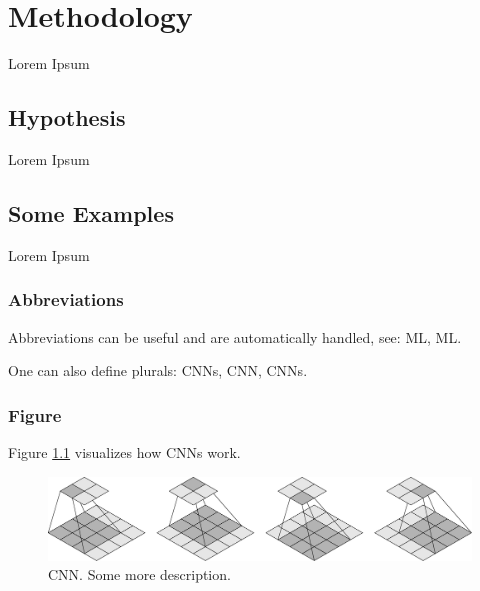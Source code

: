 

\chapter{Methodology}
\label{ch:methodology}

Lorem Ipsum


\section{Hypothesis}
\label{sec:methodology:hypothesis}

Lorem Ipsum


\section{Some Examples}
\label{sec:methodology:important_stuff}

Lorem Ipsum


\subsection{Abbreviations}
\label{sec:methodology:example:abbreviation}
%
Abbreviations can be useful and are automatically handled, see: \gls{ML}, \gls{ML}.

One can also define plurals: \glspl{CNN}, \gls{CNN}, \glspl{CNN}.


\subsection{Figure}
\label{sec:methodology:example:figure}
%
Figure \ref{fig:cnn} visualizes how \glspl{CNN} work.

\begin{figure}[h]%
	\centering
	\includegraphics[width=\textwidth]{figures/cnn}
	\caption{
		CNN. Some more description.
	}
	\label{fig:cnn}
\end{figure}
%


